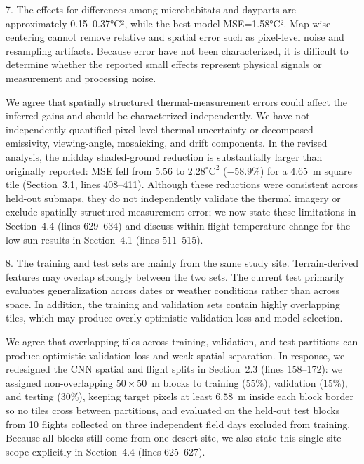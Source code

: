 \documentclass[12pt,english]{reviewresponse}
\begin{document}
\begin{revcomment}
7. The effects for differences among microhabitats and dayparts are approximately 0.15–0.37°C², while the best model MSE=1.58°C². Map-wise centering cannot remove relative and spatial error such as pixel-level noise and resampling artifacts. Because error have not been characterized, it is difficult to determine whether the reported small effects represent physical signals or measurement and processing noise.
\end{revcomment}

\begin{revresponse}
We agree that spatially structured thermal-measurement errors could affect the inferred gains and should be characterized independently. We have not independently quantified pixel-level thermal uncertainty or decomposed emissivity, viewing-angle, mosaicking, and drift components. In the revised analysis, the midday shaded-ground reduction is substantially larger than originally reported: MSE fell from $5.56$ to $2.28^{\circ}\mathrm{C}^2$ ($-58.9\%$) for a $4.65$~m square tile (Section~3.1, lines 408--411). Although these reductions were consistent across held-out submaps, they do not independently validate the thermal imagery or exclude spatially structured measurement error; we now state these limitations in Section~4.4 (lines 629--634) and discuss within-flight temperature change for the low-sun results in Section~4.1 (lines 511--515).
\end{revresponse}

\begin{revcomment}
8. The training and test sets are mainly from the same study site. Terrain-derived features may overlap strongly between the two sets. The current test primarily evaluates generalization across dates or weather conditions rather than across space. In addition, the training and validation sets contain highly overlapping tiles, which may produce overly optimistic validation loss and model selection.
\end{revcomment}

\begin{revresponse}
We agree that overlapping tiles across training, validation, and test partitions can produce optimistic validation loss and weak spatial separation. In response, we redesigned the CNN spatial and flight splits in Section~2.3 (lines 158--172): we assigned non-overlapping $50\times 50$~m blocks to training (55\%), validation (15\%), and testing (30\%), keeping target pixels at least $6.58$~m inside each block border so no tiles cross between partitions, and evaluated on the held-out test blocks from 10 flights collected on three independent field days excluded from training. Because all blocks still come from one desert site, we also state this single-site scope explicitly in Section~4.4 (lines 625--627).
\end{revresponse}
\end{document}
